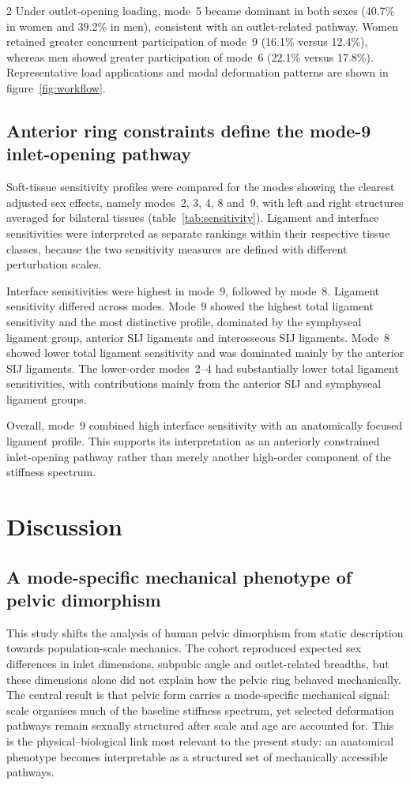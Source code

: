 \documentclass[openacc]{rsproca_new}
\begin{document}
\begin{multicols}{2}
Under outlet-opening loading, mode~5 became dominant in both sexes (40.7\% in women and 39.2\% in men), consistent with an outlet-related pathway. Women retained greater concurrent participation of mode~9 (16.1\% versus 12.4\%), whereas men showed greater participation of mode~6 (22.1\% versus 17.8\%). Representative load applications and modal deformation patterns are shown in figure~\ref{fig:workflow}.

\subsection{Anterior ring constraints define the mode-9 inlet-opening pathway}

Soft-tissue sensitivity profiles were compared for the modes showing the clearest adjusted sex effects, namely modes~2, 3, 4, 8 and~9, with left and right structures averaged for bilateral tissues (table~\ref{tab:sensitivity}). Ligament and interface sensitivities were interpreted as separate rankings within their respective tissue classes, because the two sensitivity measures are defined with different perturbation scales.

Interface sensitivities were highest in mode~9, followed by mode~8. Ligament sensitivity differed across modes. Mode~9 showed the highest total ligament sensitivity and the most distinctive profile, dominated by the symphyseal ligament group, anterior SIJ ligaments and interosseous SIJ ligaments. Mode~8 showed lower total ligament sensitivity and was dominated mainly by the anterior SIJ ligaments. The lower-order modes~2--4 had substantially lower total ligament sensitivities, with contributions mainly from the anterior SIJ and symphyseal ligament groups.

Overall, mode~9 combined high interface sensitivity with an anatomically focused ligament profile. This supports its interpretation as an anteriorly constrained inlet-opening pathway rather than merely another high-order component of the stiffness spectrum.

\section{Discussion}
\subsection{A mode-specific mechanical phenotype of pelvic dimorphism}

This study shifts the analysis of human pelvic dimorphism from static description towards population-scale mechanics. The cohort reproduced expected sex differences in inlet dimensions, subpubic angle and outlet-related breadths, but these dimensions alone did not explain how the pelvic ring behaved mechanically. The central result is that pelvic form carries a mode-specific mechanical signal: scale organises much of the baseline stiffness spectrum, yet selected deformation pathways remain sexually structured after scale and age are accounted for. This is the physical--biological link most relevant to the present study: an anatomical phenotype becomes interpretable as a structured set of mechanically accessible pathways.


\end{multicols}
\end{document}
